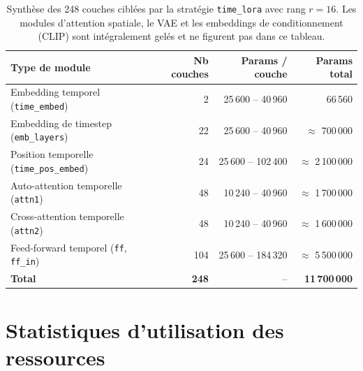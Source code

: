 \begin{table}[ht]
  \centering
  \begin{tabular}{lrrr}
    \hline
    \textbf{Type de module} & \textbf{Nb couches} &
    \textbf{Params / couche} & \textbf{Params total} \\
    \hline
    Embedding temporel (\texttt{time\_embed}) & 2
      & 25\,600 -- 40\,960 & 66\,560 \\
    Embedding de timestep (\texttt{emb\_layers}) & 22
      & 25\,600 -- 40\,960 & $\approx$ 700\,000 \\
    Position temporelle (\texttt{time\_pos\_embed}) & 24
      & 25\,600 -- 102\,400 & $\approx$ 2\,100\,000 \\
    Auto-attention temporelle (\texttt{attn1}) & 48
      & 10\,240 -- 40\,960 & $\approx$ 1\,700\,000 \\
    Cross-attention temporelle (\texttt{attn2}) & 48
      & 10\,240 -- 40\,960 & $\approx$ 1\,600\,000 \\
    Feed-forward temporel (\texttt{ff}, \texttt{ff\_in}) & 104
      & 25\,600 -- 184\,320 & $\approx$ 5\,500\,000 \\
    \hline
    \textbf{Total} & \textbf{248} & -- & \textbf{11\,700\,000} \\
    \hline
  \end{tabular}
  \caption{Synthèse des 248 couches ciblées par la stratégie \texttt{time\_lora} avec rang $r = 16$. Les modules d'attention spatiale, le VAE et les embeddings de conditionnement (CLIP) sont intégralement gelés et ne figurent pas dans ce tableau.}
  \label{tab:lora-layers}
\end{table}

\section*{Statistiques d'utilisation des ressources}

